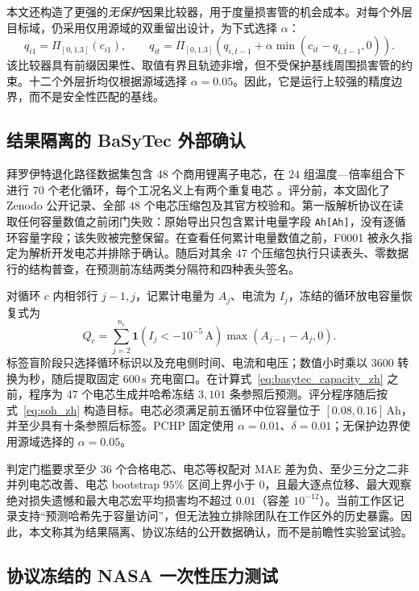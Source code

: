 \documentclass[UTF8,11pt]{ctexart}
\begin{document}
本文还构造了更强的\emph{无保护}因果比较器，用于度量损害管的机会成本。对每个外层目标域，仍采用仅用源域的双重留出设计，为下式选择 $\alpha$：
\[
q_{i1}=\Pi_{[0,1.3]}(c_{i1}),\qquad
q_{it}=\Pi_{[0,1.3]}\!\left(q_{i,t-1}+\alpha\min(c_{it}-q_{i,t-1},0)\right).
\]
该比较器具有前缀因果性、取值有界且轨迹非增，但不受保护基线周围损害管的约束。十二个外层折均仅根据源域选择 $\alpha=0.05$。因此，它是运行上较强的精度边界，而不是安全性匹配的基线。

\subsection{结果隔离的 BaSyTec 外部确认}

拜罗伊特退化路径数据集包含 $48$ 个商用锂离子电芯，在 $24$ 组温度—倍率组合下进行 $70$ 个老化循环，每个工况名义上有两个重复电芯 \citep{ramasubramanian2025degradation,roder2025degradationdata}。评分前，本文固化了 Zenodo 公开记录、全部 $48$ 个电芯压缩包及其官方校验和。第一版解析协议在读取任何容量数值之前闭门失败：原始导出只包含累计电量字段 \texttt{Ah[Ah]}，没有逐循环容量字段；该失败被完整保留。在查看任何累计电量数值之前，F0001 被永久指定为解析开发电芯并排除于确认。随后对其余 $47$ 个压缩包执行只读表头、零数据行的结构普查，在预测前冻结两类分隔符和四种表头签名。

对循环 $c$ 内相邻行 $j-1,j$，记累计电量为 $A_j$、电流为 $I_j$，冻结的循环放电容量恢复式为
\begin{equation}
Q_c=\sum_{j=2}^{n_c}\mathbf{1}\!\left(I_j<-10^{-5}\,\mathrm{A}\right)
\max(A_{j-1}-A_j,0).
\label{eq:basytec_capacity_zh}
\end{equation}
标签盲阶段只选择循环标识以及充电侧时间、电流和电压；数值小时乘以 $3600$ 转换为秒，随后提取固定 $600\,\mathrm{s}$ 充电窗口。在计算式~\eqref{eq:basytec_capacity_zh} 之前，程序为 $47$ 个电芯生成并哈希冻结 $3{,}101$ 条参照后预测。评分程序随后按式~\eqref{eq:soh_zh} 构造目标。电芯必须满足前五循环中位容量位于 $[0.08,0.16]\,\mathrm{Ah}$，并至少具有十条参照后标签。PCHP 固定使用 $\alpha=0.01$、$\delta=0.01$；无保护边界使用源域选择的 $\alpha=0.05$。

判定门槛要求至少 $36$ 个合格电芯、电芯等权配对 MAE 差为负、至少三分之二非并列电芯改善、电芯 bootstrap $95\%$ 区间上界小于 $0$，且最大逐点位移、最大观察绝对损失遗憾和最大电芯宏平均损害均不超过 $0.01$（容差 $10^{-12}$）。当前工作区记录支持“预测哈希先于容量访问”，但无法独立排除团队在工作区外的历史暴露。因此，本文称其为结果隔离、协议冻结的公开数据确认，而不是前瞻性实验室试验。

\subsection{协议冻结的 NASA 一次性压力测试}
\end{document}
